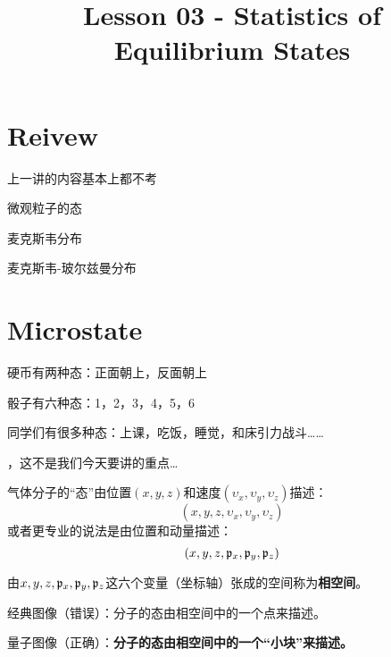 \documentclass[CJK]{beamer}
\title{Lesson 03 - Statistics of Equilibrium States}
\author{}
\date{}
\begin{document}

\section{Reivew}

\begin{frame}
\bch
上一讲的内容基本上都不考
\ech
\end{frame}


\begin{frame}
\bch
\bitem
\item{微观粒子的态}
\item{麦克斯韦分布}
\item{麦克斯韦-玻尔兹曼分布}
\eitem
\ech
\end{frame}

\section{Microstate}




\begin{frame}
\bch
\bitem
\item{硬币有两种态：正面朝上，反面朝上

}
\item{骰子有六种态：1，2，3，4，5，6

}
\item{同学们有很多种态：上课，吃饭，睡觉，和床引力战斗……

}

\eitem
\ech
\end{frame}

\begin{frame}
\bch


\skipline

，这不是我们今天要讲的重点…
\ech
\end{frame}

\begin{frame}
\bch
气体分子的“态”由位置$(x, y, z)$和速度$(\upsilon_x, \upsilon_y, \upsilon_z)$描述：
$$(x, y, z, \upsilon_x, \upsilon_y, \upsilon_z)$$
或者更专业的说法是由位置和动量描述：
$$(x, y, z, {\mathfrak{p}}_x, {\mathfrak{p}}_y, {\mathfrak{p}}_z)$$

由$x, y, z, {\mathfrak{p}}_x, {\mathfrak{p}}_y, {\mathfrak{p}}_z$这六个变量（坐标轴）张成的空间称为{\blue \bf 相空间}。

\bitem
\item{经典图像（错误）：分子的态由相空间中的一个点来描述。}
\item{量子图像（正确）：{\bf \blue 分子的态由相空间中的一个“小块”来描述。}}
\eitem

\ech
\end{frame}
\end{document}
